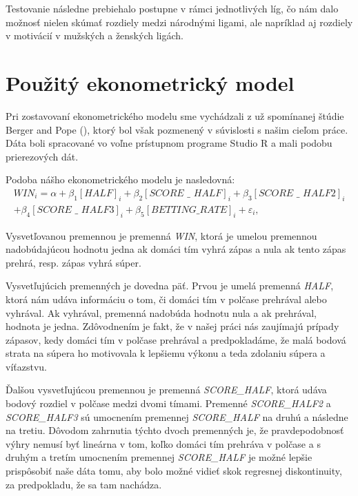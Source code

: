 \documentclass[
  digital, %
  oneside, %
  notable,   %
  lof,     %
  lot,     %
]{fithesis3}
\begin{document}
		Testovanie následne prebiehalo postupne v rámci jednotlivých líg, čo nám dalo možnosť nielen skúmať rozdiely medzi národnými ligami, ale napríklad aj rozdiely v motivácií v mužských a ženských ligách.
		
		\section{Použitý ekonometrický model}
		Pri zostavovaní ekonometrického modelu sme vychádzali z už spomínanej štúdie Berger and Pope (\citeyear{berger2011}), ktorý bol však pozmenený v súvislosti s našim cieľom práce. Dáta boli spracované vo voľne prístupnom programe Studio R a mali podobu prierezových dát.
		
		Podoba nášho ekonometrického modelu je nasledovná:
		\begin{multline}
		WIN_{i} = \alpha + \beta _{1} [\textit{HALF}]_{i} + \beta _{2} [\textit{SCORE~\_~HALF}]_{i} + \beta _{3} [\textit{SCORE~\_~HALF2}]_{i} \\
		+ \beta _{4} [\textit{SCORE~\_~HALF3}]_{i} + \beta _{5} [\textit{BETTING\_RATE}]_{i} + \varepsilon_{i},
		\end{multline}
		
		Vysvetľovanou premennou je premenná \textit{WIN}, ktorá je umelou premennou nadobúdajúcou hodnotu jedna ak domáci tím vyhrá zápas a nula ak tento zápas prehrá, resp. zápas vyhrá súper. 
		
		Vysvetľujúcich premenných je dovedna päť. Prvou je umelá premenná \textit{HALF}, ktorá nám udáva informáciu o tom, či domáci tím v polčase prehrával alebo vyhrával. Ak vyhrával, premenná nadobúda hodnotu nula a ak prehrával, hodnota je jedna. Zdôvodnením je fakt, že v našej práci nás zaujímajú prípady zápasov, kedy domáci tím v polčase prehrával a predpokladáme, že malá bodová strata na súpera ho motivovala k lepšiemu výkonu a teda zdolaniu súpera a víťazstvu. 
		
		Ďalšou vysvetľujúcou premennou je premenná \textit{SCORE\_HALF}, ktorá udáva bodový rozdiel v polčase medzi dvomi tímami. Premenné \textit{SCORE\_HALF2} a \textit{SCORE\_HALF3} sú umocnením premennej \textit{SCORE\_HALF} na druhú a následne na tretiu. Dôvodom zahrnutia týchto dvoch premenných je, že pravdepodobnosť výhry nemusí byť lineárna v tom, koľko domáci tím prehráva v polčase a s druhým a tretím umocnením premennej \textit{SCORE\_HALF} je možné lepšie prispôsobiť naše dáta tomu, aby bolo možné vidieť skok regresnej diskontinuity,  za predpokladu, že sa tam nachádza.
		
\end{document}
